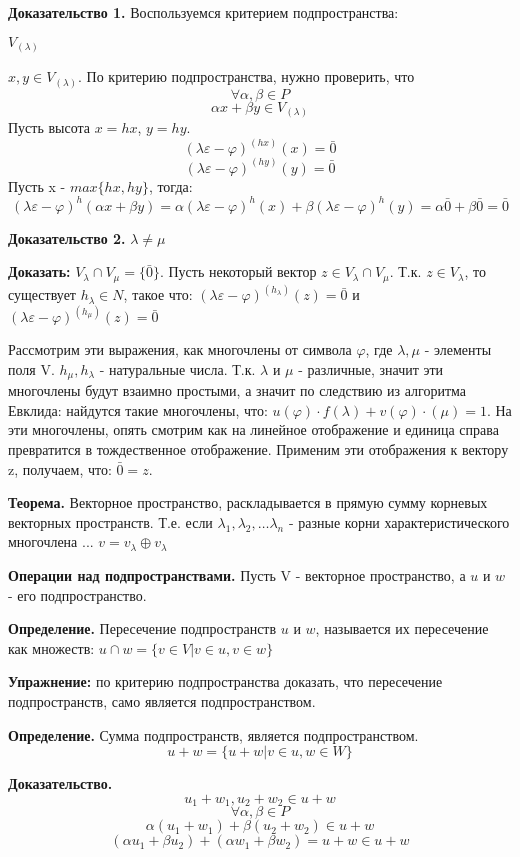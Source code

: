 \documentclass{article}
\begin{document}
{\bf Доказательство 1.} Воспользуемся критерием подпространства:

$V_(\lambda)$

$x, y \in V_(\lambda)$. По критерию подпространства, нужно проверить, что
$$\forall \alpha, \beta \in P$$
$$\alpha x + \beta y \in V_(\lambda)$$
Пусть высота $x=hx$, $y=hy$.
$$(\lambda\varepsilon-\varphi)^(hx) (x)=\bar{0}$$
$$(\lambda\varepsilon-\varphi)^(hy) (y)=\bar{0}$$
Пусть x - $max\{hx, hy\}$, тогда:
$$(\lambda\varepsilon-\varphi)^h(\alpha x+\beta y)=\alpha(\lambda\varepsilon-\varphi)^h(x)+\beta(\lambda\varepsilon-\varphi)^h(y)=\alpha\bar{0}+\beta\bar{0}=\bar{0}$$

{\bf Доказательство 2.} $\lambda\ne\mu$

{\bf Доказать:} $V_\lambda\cap V_\mu=\{\bar{0}\}$. Пусть некоторый вектор $z \in V_\lambda\cap V_\mu$. Т.к. $z \in V_\lambda$, то существует $h_\lambda \in N$, такое что: $(\lambda\varepsilon-\varphi)^(h_\lambda) (z)=\bar{0}$ и $(\lambda\varepsilon-\varphi)^(h_\mu) (z)=\bar{0}$

Рассмотрим эти выражения, как многочлены от символа $\varphi$, где $\lambda, \mu$ - элементы поля V. $h_\mu, h_\lambda$ - натуральные числа. Т.к. $\lambda$ и $\mu$ - различные, значит эти многочлены будут взаимно простыми, а значит по следствию из алгоритма Евклида: найдутся такие многочлены, что: $u(\varphi)\cdot f(\lambda)+v(\varphi)\cdot(\mu)=1$. На эти  многочлены, опять смотрим как на линейное отображение и единица справа превратится в тождественное отображение. Применим эти отображения к вектору z, получаем, что: $\bar{0}=z$.

{\bf Теорема.} Векторное пространство, раскладывается в прямую сумму корневых векторных пространств. Т.е. если $\lambda_1, \lambda_2, \ldots\lambda_n$ - разные корни характеристического многочлена ... $v=v_\lambda\oplus v_\lambda$

{\bf Операции над подпространствами.} Пусть V - векторное пространство, а $u$ и $w$ - его подпространство.

{\bf Определение.} Пересечение подпространств $u$ и $w$, называется  их пересечение как множеств: $u \cap w = \{v \in V| v \in u, v \in w\}$

{\bf Упражнение:} по критерию подпространства доказать, что пересечение подпространств, само является подпространством.

{\bf Определение.} Сумма подпространств, является подпространством.
$$u+w=\{u+w|v \in u, w \in W\}$$

{\bf Доказательство.} $$u_1+w_1, u_2+w_2 \in u+w$$
$$\forall \alpha, \beta \in P$$
$$\alpha(u_1+w_1)+\beta(u_2+w_2) \in u+w$$
$$(\alpha u_1+\beta u_2)+(\alpha w_1+\beta w_2)=u+w \in u+w$$
\end{document}
